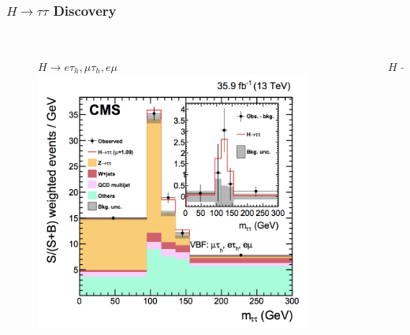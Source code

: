 \documentclass[xcolor={usenames,dvipsnames,svgnames,table}]{beamer}
\begin{document}
\begin{frame}
	\frametitle{$H \rightarrow \tau\tau$ Discovery}
	\begin{columns}
	\begin{column}{0.49\textwidth}
		\begin{figure}[t]
			\\
			\vspace{-0.5cm}
			\centering \textcolor{color1}{$H \rightarrow e\tau_{h}, \mu\tau_{h}, e\mu$}\\
			\includegraphics[width=1.\textwidth]{plots/higgstautau_otherchannel.png}
		\end{figure}
	\end{column}
	\begin{column}{0.49\textwidth}
		\begin{figure}[t]
			\\
			\vspace{-0.5cm}
			\centering \textcolor{color1}{$H \rightarrow \tau_{h}\tau_{h}$}\\

\end{figure}
\end{column}
\end{columns}
\end{frame}
\end{document}
